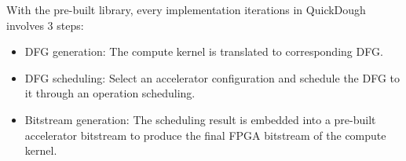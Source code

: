 \begin{table}
\centering
\caption{Accelerators generated using QuickDough \label{tab:final-acc-config}}{
}
\end{table}

With the pre-built library, every implementation iterations in QuickDough involves 3 steps:
\begin{itemize}[label=\textbullet,leftmargin=2em,rightmargin=\leftmargin]
\item DFG generation: The compute kernel is translated to corresponding DFG.
\item DFG scheduling: Select an accelerator configuration and schedule the DFG to it through an
    operation scheduling. 
\item Bitstream generation: The scheduling result is embedded into a pre-built accelerator bitstream 
to produce the final FPGA bitstream of the compute kernel.
\end{itemize}

